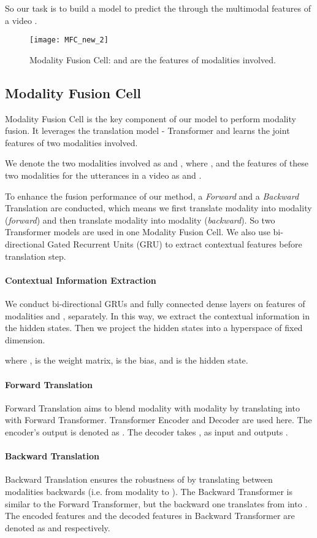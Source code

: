 \documentclass[sigconf]{acmart}
\begin{document}
	So our task is to build a model to predict the  through the multimodal features of a video .
	\begin{figure}[t]
		\centering
		\texttt{[image: MFC\_new\_2]}
		\caption{Modality Fusion Cell:  and  are the features of modalities involved.}
		\label{fig:mfc}
	\end{figure}
	
	\subsection{Modality Fusion Cell}
	Modality Fusion Cell is the key component of our model to perform modality fusion. It leverages the translation model - Transformer and learns the joint features of two modalities involved.
	
	We denote the two modalities involved as  and , where , and the features of these two modalities for the  utterances in a video as  and .
	
	To enhance the fusion performance of our method, a \textit{Forward} and a \textit{Backward} Translation are conducted, which means we first translate modality  into modality  (\textit{forward}) and then translate modality  into modality  (\textit{backward}). So two Transformer models are used in one Modality Fusion Cell. We also use bi-directional Gated Recurrent Units (GRU) to extract contextual features before translation step.
	
	\paragraph{Contextual Information Extraction}
	We conduct bi-directional GRUs and fully connected dense layers on features of modalities  and , separately. In this way, we extract the contextual information in the hidden states. Then we project the hidden states into a hyperspace of fixed dimension.
	
	
	where ,  is the weight matrix,  is the bias, and  is the hidden state. 
	
	\paragraph{Forward Translation}
	Forward Translation aims to blend modality  with modality  by translating  into  with Forward Transformer. Transformer Encoder and Decoder are used here. The encoder's output is denoted as . The decoder takes ,  as input and outputs .
	
	\paragraph{Backward Translation}
	Backward Translation ensures the robustness of  by translating between modalities backwards (i.e. from modality  to ). The Backward Transformer is similar to the Forward Transformer, but the backward one translates from  into . The encoded features and the decoded features in Backward Transformer are denoted as  and  respectively.
\end{document}
